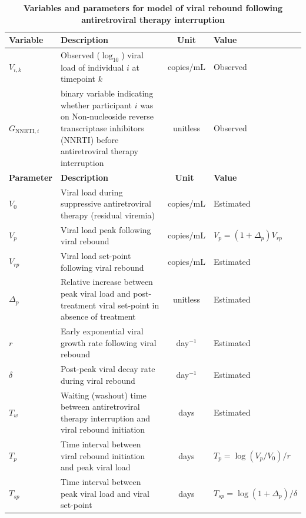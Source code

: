 \documentclass{article}[11pt]
\begin{document}
\begin{table}[ht]
\centering
\caption{\textbf{Variables and parameters for model of viral rebound following antiretroviral therapy interruption}}
\begin{tabular}{lp{8cm}cl}
 \toprule
\textbf{Variable} & \textbf{Description} & \textbf{Unit} & \textbf{Value} \\
\midrule
$V_{i,k}$ & Observed ($\log_{10}$) viral load of individual $i$ at timepoint $k$ & copies/mL & Observed\\
$G_{\text{NNRTI},i}$ & binary variable indicating whether participant $i$ was on Non-nucleoside reverse transcriptase inhibitors (NNRTI) before antiretroviral therapy interruption & unitless & Observed \\
\toprule
\textbf{Parameter} & \textbf{Description} & \textbf{Unit}\ & \textbf{Value} \\
\midrule
$V_0$ & Viral load during suppressive antiretroviral therapy (residual viremia) & copies/mL & Estimated\\
$V_p$ & Viral load peak following viral rebound & copies/mL & $V_p = (1+\Delta_p) V_{rp} $\\
$V_{rp}$ & Viral load set-point following viral rebound &  copies/mL & Estimated\\
$\Delta_p$ & Relative increase between peak viral load and post-treatment viral set-point in absence of treatment & unitless & Estimated\\
$r$ & Early exponential viral growth rate following viral rebound & day$^{-1}$ & Estimated\\
$\delta$ & Post-peak viral decay rate during viral rebound & day$^{-1}$ & Estimated\\
$T_w$ & Waiting (washout) time between antiretroviral therapy interruption and viral rebound initiation & days & Estimated \\
$T_{p}$ & Time interval between viral rebound initiation and peak viral load & days & $T_p = \log(V_p/V_0)/r$\\
$T_{sp}$ & Time interval between peak viral load and viral set-point & days & $T_{sp} = \log(1+\Delta_p)/\delta$ \\
\bottomrule
\end{tabular}
\label{table:viralrebound_params}
\end{table}
\end{document}
